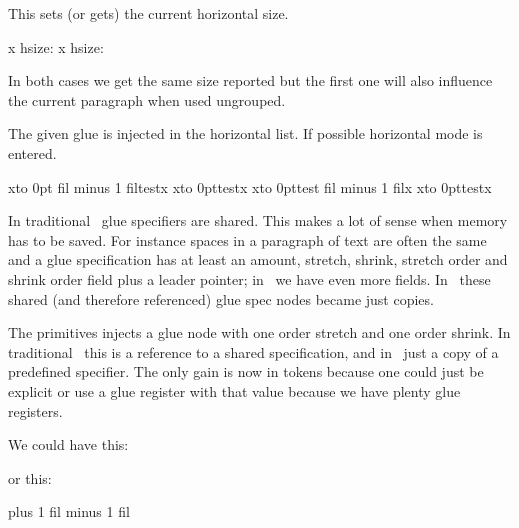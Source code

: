 \stopoldprimitive

\startoldprimitive[title={\prm {hsize}}]

This sets (or gets) the current horizontal size.

\startbuffer
\hsize 40pt \vbox{x} hsize: \the{}
\vbox{\hsize 40pt x} hsize: \the{}
\stopbuffer

\typebuffer

In both cases we get the same size reported but the first one will also influence
the current paragraph when used ungrouped.

\startlines
\getbuffer
\stoplines

\stopoldprimitive

\startoldprimitive[title={\prm {hskip}}]

The given glue is injected in the horizontal list. If possible horizontal mode is
entered.

\stopoldprimitive

\startoldprimitive[title={\prm {hss}}]

\startbuffer
x\hbox to 0pt{ fil minus 1 fil\relax test}x
x\hbox to 0pt{\hss test}x
x\hbox to 0pt{test fil minus 1 fil\relax}x
x\hbox to 0pt{test\hss}x
\stopbuffer

In traditional \TEX\ glue specifiers are shared. This makes a lot of sense when
memory has to be saved. For instance spaces in a paragraph of text are often the
same and a glue specification has at least an amount, stretch, shrink, stretch
order and shrink order field plus a leader pointer; in \LUAMETATEX\ we have even
more fields. In \LUATEX\ these shared (and therefore referenced) glue spec nodes
became just copies.

\typebuffer

The  primitives injects a glue node with one order stretch and one
order shrink. In traditional \TEX\ this is a reference to a shared specification,
and in \LUATEX\ just a copy of a predefined specifier. The only gain is now in
tokens because one could just be explicit or use a glue register with that value
because we have plenty glue registers.

\startlines
\getbuffer
\stoplines

We could have this:

\starttyping
\permanent\protected\untraced{}
\stoptyping

or this:

\starttyping
\gluespecdef\hssglue 0pt plus 1 fil minus 1 fil

